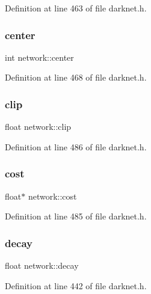 Definition at line 463 of file darknet.\+h.

\mbox{\label{structnetwork_a87bf27881ed88606fae1b80f9049e4ca}} 
\subsubsection{\texorpdfstring{center}{center}}
{\footnotesize\ttfamily int network\+::center}



Definition at line 468 of file darknet.\+h.

\mbox{\label{structnetwork_ac04afd1b20edc7f8734cf2eabe4b57f0}} 
\subsubsection{\texorpdfstring{clip}{clip}}
{\footnotesize\ttfamily float network\+::clip}



Definition at line 486 of file darknet.\+h.

\mbox{\label{structnetwork_ac80b4b4eeda5cf4cc4af5c2173d0ad31}} 
\subsubsection{\texorpdfstring{cost}{cost}}
{\footnotesize\ttfamily float$\ast$ network\+::cost}



Definition at line 485 of file darknet.\+h.

\mbox{\label{structnetwork_a9afd53b100d35dc162e48118ef4f7eea}} 
\subsubsection{\texorpdfstring{decay}{decay}}
{\footnotesize\ttfamily float network\+::decay}



Definition at line 442 of file darknet.\+h.

\mbox{\label{structnetwork_a7787a7dde0eea2d91b208c23cdba6286}} 
